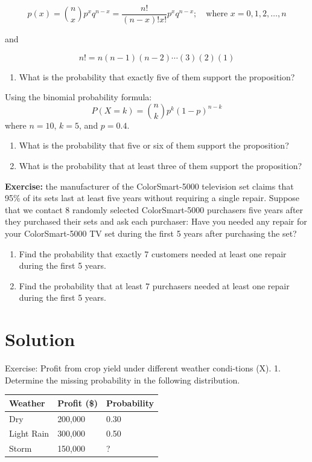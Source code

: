 \documentclass[
]{book}
\providecommand{\tightlist}{%
  \setlength{\itemsep}{0pt}\setlength{\parskip}{0pt}}
\begin{document}
\[
p(x) = \binom{n}{x} p^x q^{n-x} = \frac{n!}{(n-x)!x!} p^x q^{n-x}; \quad \text{where } x = 0, 1, 2, \ldots, n
\]

and

\[
n! = n(n-1)(n-2) \cdots (3)(2)(1)
\]

\begin{enumerate}
\def\labelenumi{\arabic{enumi}.}
\tightlist
\item
  What is the probability that exactly five of them support the proposition?
\end{enumerate}

Using the binomial probability formula:
\[
   P(X = k) = \binom{n}{k} p^k (1-p)^{n-k}
   \]
where \(n = 10\), \(k = 5\), and \(p = 0.4\).

\begin{enumerate}
\def\labelenumi{\arabic{enumi}.}
\setcounter{enumi}{1}
\item
  What is the probability that five or six of them support the proposition?
\item
  What is the probability that at least three of them support the proposition?
\end{enumerate}

\textbf{Exercise:} the manufacturer of the ColorSmart-5000 television set claims that 95\% of
its sets last at least five years without requiring a single repair. Suppose that we contact 8 randomly selected ColorSmart-5000 purchasers five years after they purchased their sets
and ask each purchaser: Have you needed any repair for your ColorSmart-5000 TV set
during the first 5 years after purchasing the set?

\begin{enumerate}
\def\labelenumi{\arabic{enumi}.}
\item
  Find the probability that exactly 7 customers needed at least one repair during the first 5 years.
\item
  Find the probability that at least 7 purchasers needed at least one repair during the first 5 years.
\end{enumerate}

\section{Solution}\label{solution}

Exercise: Profit from crop yield under different weather condi-tions (X).
1. Determine the missing probability in the following distribution.

\begin{longtable}[]{@{}lll@{}}
\toprule\noalign{}
\textbf{Weather} & \textbf{Profit (\$)} & \textbf{Probability} \\
\midrule\noalign{}
\endhead
\bottomrule\noalign{}
\endlastfoot
Dry & 200,000 & 0.30 \\
Light Rain & 300,000 & 0.50 \\
Storm & 150,000 & ? \\
\end{longtable}
\end{document}

